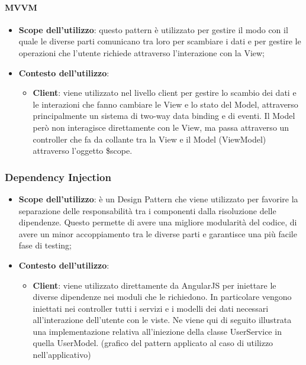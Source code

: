 		\paragraph{MVVM} %
		\label{par:mvvm}
			\begin{itemize}
				\item \textbf{Scope dell'utilizzo}: questo pattern è utilizzato per gestire il modo con il quale le diverse parti comunicano tra loro per scambiare i dati e per gestire le operazioni che l'utente richiede attraverso l'interazione con la View;

				\item \textbf{Contesto dell'utilizzo}: 
					\begin{itemize}
						\item \textbf{Client}: viene utilizzato nel livello client per gestire lo scambio dei dati e le interazioni che fanno cambiare le View e lo stato del Model, attraverso principalmente un sistema di two-way data binding e di eventi. Il Model però non interagisce direttamente con le View, ma passa attraverso un controller che fa da collante tra la View e il Model (ViewModel) attraverso l'oggetto \$scope.
					\end{itemize}
			\end{itemize}

	\subsubsection{Dependency Injection} %
	\label{ssub:dependency_injection}
		\begin{itemize}
			\item \textbf{Scope dell'utilizzo}: è un Design Pattern che viene utilizzato per favorire la separazione delle responsabilità tra i componenti dalla risoluzione delle dipendenze. Questo permette di avere una migliore modularità del codice, di avere un minor accoppiamento tra le diverse parti e garantisce una più facile fase di testing;
			\item \textbf{Contesto dell'utilizzo}: 
				\begin{itemize}
					\item \textbf{Client}: viene utilizzato direttamente da AngularJS per iniettare le diverse dipendenze nei moduli che le richiedono. In particolare vengono iniettati nei controller tutti i servizi e i modelli dei dati necessari all'interazione dell'utente con le viste. \newline
					Ne viene qui di seguito illustrata una implementazione relativa all'iniezione della classe UserService in quella UserModel. \newline
					[TO DO] (grafico del pattern applicato al caso di utilizzo nell'applicativo)
				\end{itemize}
		\end{itemize}

